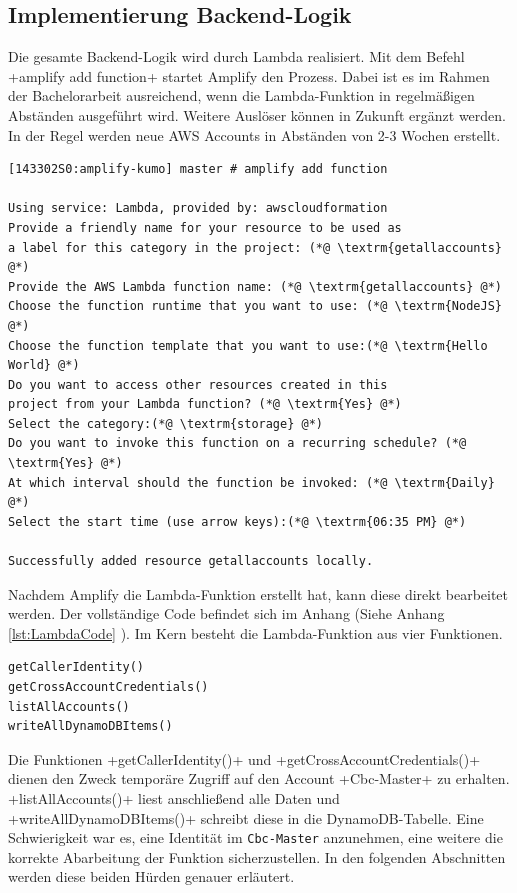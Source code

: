 \subsection{Implementierung Backend-Logik}
\label{ImpLambda}
Die gesamte Backend-Logik wird durch Lambda realisiert.
Mit dem Befehl \spverb+amplify add function+ startet Amplify den Prozess.
Dabei ist es im Rahmen der Bachelorarbeit ausreichend, wenn die Lambda-Funktion in regelmäßigen Abständen ausgeführt wird.
Weitere Auslöser können in Zukunft ergänzt werden.
In der Regel werden neue AWS Accounts in Abständen von 2-3 Wochen erstellt.
\\
\begin{lstlisting}[basicstyle=\ttfamily\small, breaklines=true , frame = single, backgroundcolor=\color{flashwhite} ]
[143302S0:amplify-kumo] master # amplify add function

Using service: Lambda, provided by: awscloudformation
Provide a friendly name for your resource to be used as
a label for this category in the project: (*@ \textrm{getallaccounts} @*)
Provide the AWS Lambda function name: (*@ \textrm{getallaccounts} @*)
Choose the function runtime that you want to use: (*@ \textrm{NodeJS} @*)
Choose the function template that you want to use:(*@ \textrm{Hello World} @*)
Do you want to access other resources created in this
project from your Lambda function? (*@ \textrm{Yes} @*)
Select the category:(*@ \textrm{storage} @*)
Do you want to invoke this function on a recurring schedule? (*@ \textrm{Yes} @*)
At which interval should the function be invoked: (*@ \textrm{Daily} @*)
Select the start time (use arrow keys):(*@ \textrm{06:35 PM} @*)

Successfully added resource getallaccounts locally.
\end{lstlisting}

\clearpage
Nachdem Amplify die Lambda-Funktion erstellt hat, kann diese direkt bearbeitet werden.
Der vollständige Code befindet sich im Anhang (Siehe Anhang \ref{lst:LambdaCode} ).
Im Kern besteht die Lambda-Funktion aus vier Funktionen.
\\

\begin{lstlisting}[basicstyle=\ttfamily\small, breaklines=true , frame = single, backgroundcolor=\color{flashwhite} ]
getCallerIdentity()
getCrossAccountCredentials()
listAllAccounts()
writeAllDynamoDBItems()
\end{lstlisting}


Die Funktionen \spverb+getCallerIdentity()+ und \spverb+getCrossAccountCredentials()+ dienen den Zweck temporäre Zugriff auf den Account \spverb+Cbc-Master+ zu erhalten.
\spverb+listAllAccounts()+ liest anschließend alle Daten und \spverb+writeAllDynamoDBItems()+ schreibt diese in die DynamoDB-Tabelle.
Eine Schwierigkeit war es, eine Identität im \verb+Cbc-Master+ anzunehmen, eine weitere die korrekte Abarbeitung der Funktion sicherzustellen.
In den folgenden Abschnitten werden diese beiden Hürden genauer erläutert.

